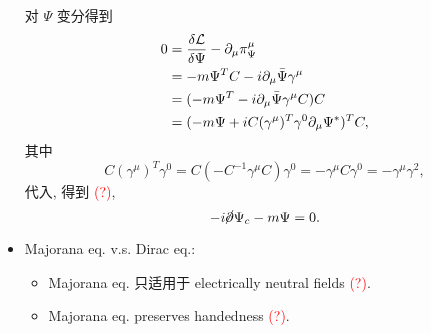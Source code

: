 \begin{itemize}
	\begin{tcolorbox}[title=calculation:]
		对 $\Psi$ 变分得到
		\begin{align}
			0 &= \frac{\delta \mathcal{L}}{\delta \Psi} - \partial_\mu \pi_\Psi^\mu \notag \\
			&= - m \Psi^T C - i \partial_\mu \bar{\Psi} \gamma^\mu \notag \\
			&= (- m \Psi^T - i \partial_\mu \bar{\Psi} \gamma^\mu C) C \notag \\
			&= (- m \Psi + i C (\gamma^\mu)^T \gamma^0 \partial_\mu \Psi^*)^T C,
		\end{align}
		其中
		\begin{equation}
			C (\gamma^\mu)^T \gamma^0 = C (- C^{- 1} \gamma^\mu C) \gamma^0 = - \gamma^\mu C \gamma^0 = - \gamma^\mu \gamma^2,
		\end{equation}
		代入, 得到 \textcolor{red}{(?)},
		\begin{equation}
			- i \cancel{\partial} \Psi_c - m \Psi = 0.
		\end{equation}
	\end{tcolorbox}
	
	\item Majorana eq. v.s. Dirac eq.:
	\begin{itemize}
		\item Majorana eq. 只适用于 electrically neutral fields \textcolor{red}{(?)}.
		
		\item Majorana eq. preserves handedness \textcolor{red}{(?)}.
	\end{itemize}
\end{itemize}
